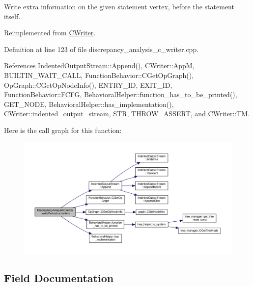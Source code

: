 Write extra information on the given statement vertex, before the statement itself. 



Reimplemented from \hyperlink{classCWriter_a89fcc230d50a8b5087a08348b67b470a}{C\+Writer}.



Definition at line 123 of file discrepancy\+\_\+analysis\+\_\+c\+\_\+writer.\+cpp.



References Indented\+Output\+Stream\+::\+Append(), C\+Writer\+::\+AppM, B\+U\+I\+L\+T\+I\+N\+\_\+\+W\+A\+I\+T\+\_\+\+C\+A\+LL, Function\+Behavior\+::\+C\+Get\+Op\+Graph(), Op\+Graph\+::\+C\+Get\+Op\+Node\+Info(), E\+N\+T\+R\+Y\+\_\+\+ID, E\+X\+I\+T\+\_\+\+ID, Function\+Behavior\+::\+F\+C\+FG, Behavioral\+Helper\+::function\+\_\+has\+\_\+to\+\_\+be\+\_\+printed(), G\+E\+T\+\_\+\+N\+O\+DE, Behavioral\+Helper\+::has\+\_\+implementation(), C\+Writer\+::indented\+\_\+output\+\_\+stream, S\+TR, T\+H\+R\+O\+W\+\_\+\+A\+S\+S\+E\+RT, and C\+Writer\+::\+TM.

Here is the call graph for this function\+:
\nopagebreak
\begin{figure}[H]
\begin{center}
\leavevmode
\includegraphics[width=350pt]{d4/d5c/classDiscrepancyAnalysisCWriter_a891686ef683dad2ed3b99d071f3fb69a_cgraph}
\end{center}
\end{figure}


\subsection{Field Documentation}
\mbox{\label{classDiscrepancyAnalysisCWriter_ac90f9f7924ce6885161d69cac33672bd}} 
